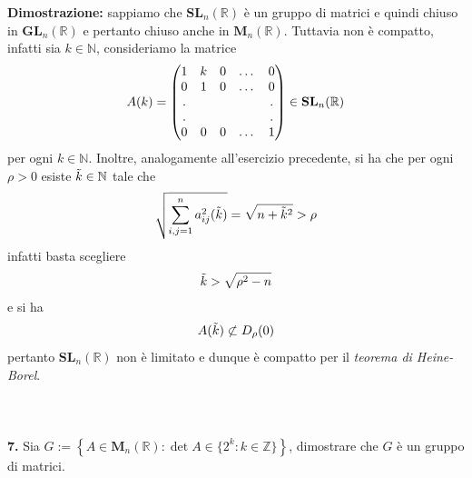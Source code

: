\documentclass{article}
\begin{document}
\textbf{Dimostrazione:} sappiamo che $\mathbf{SL}_n(\mathbb{R})$ è un gruppo di matrici e quindi chiuso in $\mathbf{GL}_n(\mathbb{R})$ e pertanto chiuso anche in $\mathbf{M}_n(\mathbb{R})$. Tuttavia non è compatto, infatti sia $k \in \mathbb{N}$, consideriamo la matrice
\begin{gather} A(k) =
    \begin{pmatrix}
        1 & k & 0 & \dots & 0 \\
        0 & 1 & 0 & \dots & 0 \\
        . & & & & . \\
        . & & & & . \\
        0 & 0 & 0 & \dots & 1
    \end{pmatrix} \in \mathbf{SL}_n(\mathbb{R}) \notag
\end{gather}
per ogni $k \in \mathbb{N}$. Inoltre, analogamente all'esercizio precedente, si ha che per ogni $\rho > 0$ esiste $\Tilde{k} \in \mathbb{N}$ tale che
\begin{gather}
    \sqrt{\sum_{i, j = 1}^n a^2_{ij}(\Tilde{k})} = \sqrt{n + \Tilde{k}^2} > \rho \notag
\end{gather}
infatti basta scegliere
\begin{gather}
    \Tilde{k} > \sqrt{\rho^2 - n} \notag
\end{gather}
e si ha
\begin{gather}
    A(\Tilde{k}) \not\subset D_\rho(0) \notag
\end{gather}
pertanto $\mathbf{SL}_n(\mathbb{R})$ non è limitato e dunque è compatto per il \textit{teorema di Heine-Borel}. \\ \\ \\ \\
\textbf{7.} Sia $G := \left\{ A \in \mathbf{M}_n(\mathbb{R}) : \det A \in \{ 2^k : k \in \mathbb{Z} \} \right\}$, dimostrare che $G$ è un gruppo di matrici. \\
\end{document}
